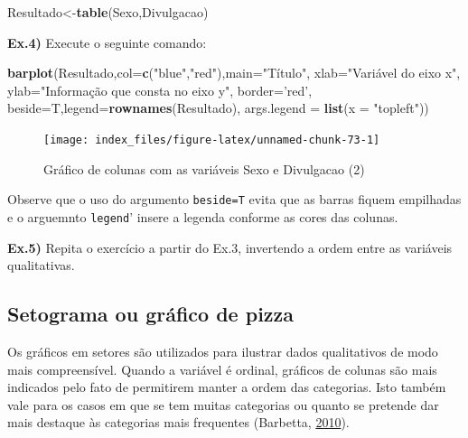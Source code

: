 \documentclass[12pt,brazil,oneside]{book}
\newenvironment{Shaded}{\begin{snugshade}}{\end{snugshade}}
\newcommand{\DataTypeTok}[1]{\textcolor[rgb]{0.13,0.29,0.53}{#1}}
\newcommand{\KeywordTok}[1]{\textcolor[rgb]{0.13,0.29,0.53}{\textbf{#1}}}
\newcommand{\NormalTok}[1]{#1}
\newcommand{\StringTok}[1]{\textcolor[rgb]{0.31,0.60,0.02}{#1}}
\begin{document}
\begin{Shaded}
\begin{Highlighting}[]
\NormalTok{Resultado<-}\KeywordTok{table}\NormalTok{(Sexo,Divulgacao)}
\end{Highlighting}
\end{Shaded}

\textbf{Ex.4)} Execute o seguinte comando:

\begin{Shaded}
\begin{Highlighting}[]
\KeywordTok{barplot}\NormalTok{(Resultado,}\DataTypeTok{col=}\KeywordTok{c}\NormalTok{(}\StringTok{"blue"}\NormalTok{,}\StringTok{"red"}\NormalTok{),}\DataTypeTok{main=}\StringTok{"Título"}\NormalTok{,}
        \DataTypeTok{xlab=}\StringTok{"Variável do eixo x"}\NormalTok{,}
        \DataTypeTok{ylab=}\StringTok{"Informação que consta no eixo y"}\NormalTok{, }
        \DataTypeTok{border=}\StringTok{'red'}\NormalTok{, }
        \DataTypeTok{beside=}\NormalTok{T,}\DataTypeTok{legend=}\KeywordTok{rownames}\NormalTok{(Resultado),}
        \DataTypeTok{args.legend =} \KeywordTok{list}\NormalTok{(}\DataTypeTok{x =} \StringTok{"topleft"}\NormalTok{))}
\end{Highlighting}
\end{Shaded}

\begin{figure}[H]

{\centering \texttt{[image: index\_files/figure-latex/unnamed-chunk-73-1]} 

}

\caption{Gráfico de colunas com as variáveis Sexo e Divulgacao (2)}\label{fig:unnamed-chunk-73}
\end{figure}

Observe que o uso do argumento \texttt{beside=T} evita que as barras fiquem empilhadas e o arguemnto \texttt{legend}' insere a legenda conforme as cores das colunas.

\textbf{Ex.5)} Repita o exercício a partir do Ex.3, invertendo a ordem entre as variáveis qualitativas.

\hypertarget{setograma-ou-grafico-de-pizza}{%
\subsection{Setograma ou gráfico de pizza}\label{setograma-ou-grafico-de-pizza}}

Os gráficos em setores são utilizados para ilustrar dados qualitativos de modo mais compreensível. Quando a variável é ordinal, gráficos de colunas são mais indicados pelo fato de permitirem manter a ordem das categorias. Isto também vale para os casos em que se tem muitas categorias ou quanto se pretende dar mais destaque às categorias mais frequentes (Barbetta, \protect\hyperlink{ref-barbetta1988}{2010}).
\end{document}
